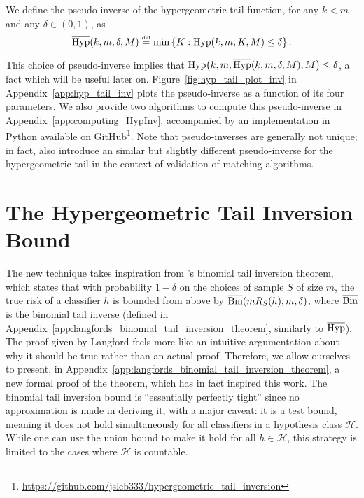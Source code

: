 \documentclass[twoside,11pt]{article}
\newcommand{\cb}[1]{\left\{#1\right\}}
\renewcommand{\H}{{\mathcal{H}}}
\newcommand{\eqdef}{\overset{\smash{\mbox{\tiny \rm def}}}{=}}
\newcommand{\BinInv}{\overline{\textnormal{Bin}}}
\newcommand{\Hyp}{\textnormal{Hyp}}
\newcommand{\HypInv}{\overline{\textnormal{Hyp}}}
\begin{document}
\begin{definition}\label{def:hyp_tail_inv}
We define the pseudo-inverse of the hypergeometric tail function, for any $k < m$ and any $\delta \in (0,1)$, as
\begin{equation*}
    \HypInv(k, m, \delta, M) \eqdef \min \cb{ K : \Hyp(k, m, K, M) \le \delta }.
\end{equation*}
\end{definition}
This choice of pseudo-inverse implies that $\Hyp\big(k,m,\HypInv(k,m,\delta,M),M\big) \le \delta$, a fact which will be useful later on.
Figure~\ref{fig:hyp_tail_plot_inv} in Appendix~\ref{app:hyp_tail_inv} plots the pseudo-inverse as a function of its four parameters.
We also provide two algorithms to compute this pseudo-inverse in Appendix~\ref{app:computing_HypInv}, accompanied by an implementation in Python available on GitHub\footnote{\url{https://github.com/jsleb333/hypergeometric_tail_inversion}}.
Note that pseudo-inverses are generally not unique; in fact, \citet{le2016validation} also introduce an similar but slightly different pseudo-inverse for the hypergeometric tail in the context of validation of matching algorithms.
















\section{The Hypergeometric Tail Inversion Bound}
\label{sec:main_bound}

The new technique takes inspiration from \citet{langford05}'s binomial tail inversion theorem, which states that with probability $1-\delta$ on the choices of sample $S$ of size $m$, the true risk of a classifier $h$ is bounded from above by $\BinInv(mR_S(h),m,\delta)$, where $\BinInv$ is the binomial tail inverse (defined in Appendix~\ref{app:langfords_binomial_tail_inversion_theorem}, similarly to $\HypInv$).
The proof given by Langford feels more like an intuitive argumentation about why it should be true rather than an actual proof.
Therefore, we allow ourselves to present, in Appendix~\ref{app:langfords_binomial_tail_inversion_theorem}, a new formal proof of the theorem, which has in fact inspired this work.
The binomial tail inversion bound is ``essentially perfectly tight'' since no approximation is made in deriving it, with a major caveat: it is a test bound, meaning it does not hold simultaneously for all classifiers in a hypothesis class $\H$.
While one can use the union bound to make it hold for all $h\in\H$, this strategy is limited to the cases where $\H$ is countable.
\end{document}
